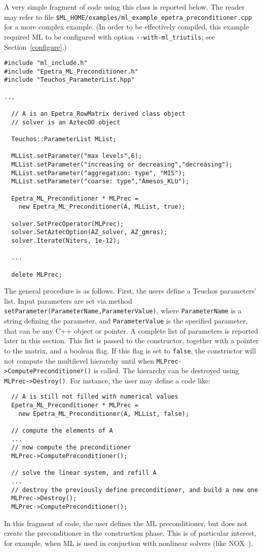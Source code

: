A very simple fragment of code using this class is reported
below. The reader may refer to file
\verb!$ML_HOME/examples/ml_example_epetra_preconditioner.cpp! for a more
complex example. (In order to be effectively compiled, this example
required ML to be configured with option \verb!--with-ml_triutils!; see
Section~\ref{configure}.) 
\begin{verbatim}
#include "ml_include.h"
#include "Epetra_ML_Preconditioner.h"
#include "Teuchos_ParameterList.hpp"

...

  // A is an Epetra_RowMatrix derived class object
  // solver is an AztecOO object

  Teuchos::ParameterList MList;

  MLList.setParameter("max levels",6);
  MLList.setParameter("increasing or decreasing","decreasing");
  MLList.setParameter("aggregation: type", "MIS");
  MLList.setParameter("coarse: type","Amesos_KLU");
  
  Epetra_ML_Preconditioner * MLPrec = 
    new Epetra_ML_Preconditioner(A, MLList, true);

  solver.SetPrecOperator(MLPrec);
  solver.SetAztecOption(AZ_solver, AZ_gmres);
  solver.Iterate(Niters, 1e-12);

  ...

  delete MLPrec;
\end{verbatim}
The general procedure is as follows. First, the users define a Teuchos
parameters' list. Input parameters are set via method
\verb!setParameter(ParameterName,ParameterValue)!, where
\verb!ParameterName! is a string defining the parameter, and
\verb!ParameterValue! is the specified parameter, that can be any C++
object or pointer. A complete list of parameters is reported later in
this section. This list is passed to the constructor, together with a
pointer to the matrix, and a boolean flag.  If this flag is set to
\verb!false!, the constructor will not compute the multilevel hierarchy
until when \verb!MLPrec->ComputePreconditioner()! is called. The
hierarchy can be destroyed using \verb!MLPrec->Destroy()!.  For
instance, the user may define a code like:
\begin{verbatim}
  // A is still not filled with numerical values
  Epetra_ML_Preconditioner * MLPrec = 
    new Epetra_ML_Preconditioner(A, MLList, false);
  
  // compute the elements of A
  ...
  // now compute the preconditioner
  MLPrec->ComputePreconditioner();

  // solve the linear system, and refill A
  ...
  // destroy the previously define preconditioner, and build a new one
  MLPrec->Destroy();
  MLPrec->ComputePreconditioner();
\end{verbatim}
In this fragment of code, the user defines the ML preconditioner, but
does not create the preconditioner in the construction phase. This is of
particular interest, for example, when ML is used in conjuction with
nonlinear solvers (like NOX~\cite{NOX-home-page}).

